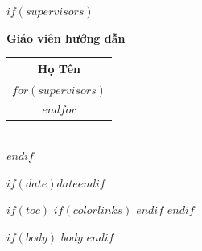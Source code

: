 \documentclass[$if(fontsize)$$fontsize$,$endif$$if(papersize)$$papersize$paper,$endif$$for(classoption)$$classoption$$sep$,$endfor$]{$documentclass$}
\renewcommand{\arraystretch}{1.4}
\begin{document}
\begin{titlepage}
\begin{center}
$if(supervisors)$
\begin{minipage}{\textwidth}
\begin{center}
\large\textbf{Giáo viên hướng dẫn}\\[0.3cm]

\setlength{\arrayrulewidth}{0.3pt} %
\renewcommand{\arraystretch}{1.8}
\begin{tabular}{@{}c@{}}
\toprule
\multicolumn{1}{c}{\textbf{Họ Tên}} \\
\midrule
$for(supervisors)$
\multicolumn{1}{c}{$supervisors$} \\
$endfor$
\bottomrule
\end{tabular}
\end{center}
\end{minipage}\\[0.8cm]
$endif$


$if(date)${\large $date$}$endif$

\end{center}
\end{titlepage}

$if(toc)$
{
$if(colorlinks)$
\hypersetup{linkcolor=$if(toccolor)$$toccolor$$else$accent$endif$}
$endif$
\setcounter{tocdepth}{$toc-depth$}
\tableofcontents
}
$endif$

$if(body)$
$body$
$endif$
\end{document}
